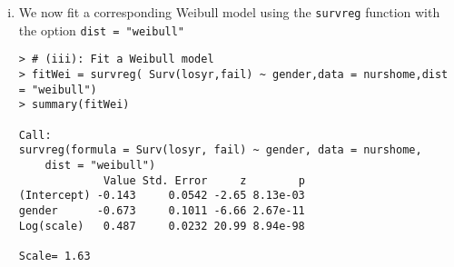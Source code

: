 \begin{enumerate}[(i)]
Now, let's examine the previous code in more detail. First, we save the KM estimates by gender in the object \verb|fitKM|. Then we use the \verb|plot| function to plot the KM estimates for males and females. However, we would also like to add the curves predicted by the exponential model on the graph. To do so, we use the function \verb|lines| (see \verb|?lines|). On the y-axis we have the survival probabilities from 1 to 0 with the increment of the sequence being 0.001 (please, see \verb|?seq|)
\begin{spacing}{1.2}
\begin{footnotesize}
\begin{verbatim}
> pct = seq(0,1,by = 0.001)
> 1-pct[c(1:5,998:1001)]
[1] 1.000 0.999 0.998 0.997 0.996 0.003 0.002 0.001 0.000
\end{verbatim}
\end{footnotesize}
\end{spacing}
and using the \verb|predict| function (please, see \verb|?predict.survreg|)
\begin{spacing}{1.2}
\begin{footnotesize}
\begin{verbatim}
predict(fitExp,newdata = data.frame(gender = 0),type = "quantile",
        p = pct)
\end{verbatim}
\end{footnotesize}
\end{spacing}  
we get the survival times at which the survival probabilities \verb|1-pct| (i.e., $1, 0.999, \ldots,0$) correspond. The reason for this odd syntax is that the \verb|predict| function returns the vector of quantiles of the distribution function $F(t) = 1 - S(t)$ (more in class if needed). 
\item We now fit a corresponding Weibull model using the \verb|survreg| function with the option \verb|dist = "weibull"|
\begin{spacing}{1.2}
\begin{footnotesize}
\begin{verbatim}
> # (iii): Fit a Weibull model
> fitWei = survreg( Surv(losyr,fail) ~ gender,data = nurshome,dist = "weibull")
> summary(fitWei)

Call:
survreg(formula = Surv(losyr, fail) ~ gender, data = nurshome, 
    dist = "weibull")
             Value Std. Error     z        p
(Intercept) -0.143     0.0542 -2.65 8.13e-03
gender      -0.673     0.1011 -6.66 2.67e-11
Log(scale)   0.487     0.0232 20.99 8.94e-98

Scale= 1.63 


\end{verbatim}
\end{footnotesize}
\end{spacing}
\end{enumerate}
